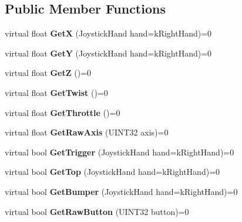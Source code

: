 \subsection*{\-Public \-Member \-Functions}
\begin{DoxyCompactItemize}
\item 
\hypertarget{classGenericHID_aec37ad96a57c42d1673ae98e13950ff8}{virtual float {\bfseries \-Get\-X} (\-Joystick\-Hand hand=k\-Right\-Hand)=0}\label{classGenericHID_aec37ad96a57c42d1673ae98e13950ff8}

\item 
\hypertarget{classGenericHID_ae6f943cc10ca54b67bacff5df38254d5}{virtual float {\bfseries \-Get\-Y} (\-Joystick\-Hand hand=k\-Right\-Hand)=0}\label{classGenericHID_ae6f943cc10ca54b67bacff5df38254d5}

\item 
\hypertarget{classGenericHID_aaf7289ae45da867b5b4c5328e66b61c0}{virtual float {\bfseries \-Get\-Z} ()=0}\label{classGenericHID_aaf7289ae45da867b5b4c5328e66b61c0}

\item 
\hypertarget{classGenericHID_ad0452a1517f47b28b5a6360b343df221}{virtual float {\bfseries \-Get\-Twist} ()=0}\label{classGenericHID_ad0452a1517f47b28b5a6360b343df221}

\item 
\hypertarget{classGenericHID_aa392c654c01b3379909ee25d0e37565a}{virtual float {\bfseries \-Get\-Throttle} ()=0}\label{classGenericHID_aa392c654c01b3379909ee25d0e37565a}

\item 
\hypertarget{classGenericHID_aa705937a89375c73dbcdd18e177e9dfa}{virtual float {\bfseries \-Get\-Raw\-Axis} (\-U\-I\-N\-T32 axis)=0}\label{classGenericHID_aa705937a89375c73dbcdd18e177e9dfa}

\item 
\hypertarget{classGenericHID_adec9a51569114af2f237a316dc394d51}{virtual bool {\bfseries \-Get\-Trigger} (\-Joystick\-Hand hand=k\-Right\-Hand)=0}\label{classGenericHID_adec9a51569114af2f237a316dc394d51}

\item 
\hypertarget{classGenericHID_a5991c05652c8f48f1bc200878d7cce50}{virtual bool {\bfseries \-Get\-Top} (\-Joystick\-Hand hand=k\-Right\-Hand)=0}\label{classGenericHID_a5991c05652c8f48f1bc200878d7cce50}

\item 
\hypertarget{classGenericHID_ae44948c457407b0f156bac3b27bb12ea}{virtual bool {\bfseries \-Get\-Bumper} (\-Joystick\-Hand hand=k\-Right\-Hand)=0}\label{classGenericHID_ae44948c457407b0f156bac3b27bb12ea}

\item 
\hypertarget{classGenericHID_a1ae5396e0a5aa0bef70a75d1a823fa3f}{virtual bool {\bfseries \-Get\-Raw\-Button} (\-U\-I\-N\-T32 button)=0}\label{classGenericHID_a1ae5396e0a5aa0bef70a75d1a823fa3f}

\end{DoxyCompactItemize}


